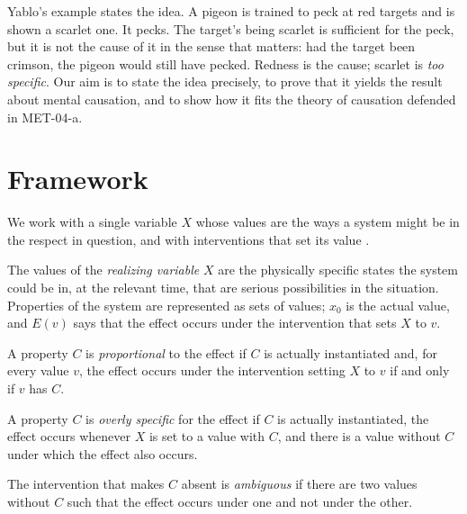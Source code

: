 \documentclass{situationist-preprint}
\begin{document}
Yablo's example states the idea. A pigeon is trained to peck at red targets and is shown a scarlet one. It pecks. The target's being scarlet is sufficient for the peck, but it is not the cause of it in the sense that matters: had the target been crimson, the pigeon would still have pecked. Redness is the cause; scarlet is \emph{too specific}. Our aim is to state the idea precisely, to prove that it yields the result about mental causation, and to show how it fits the theory of causation defended in MET-04-a.

\section{Framework}\label{s:framework}

We work with a single variable $X$ whose values are the ways a system might be in the respect in question, and with interventions that set its value \citep{Woodward2003}.

\begin{definition}\label{d:serious}
The values of the \emph{realizing variable} $X$ are the physically specific states the system could be in, at the relevant time, that are serious possibilities in the situation. Properties of the system are represented as sets of values; $x_0$ is the actual value, and $E(v)$ says that the effect occurs under the intervention that sets $X$ to $v$.
\end{definition}

\begin{definition}\label{d:prop}
A property $C$ is \emph{proportional} to the effect if $C$ is actually instantiated and, for every value $v$, the effect occurs under the intervention setting $X$ to $v$ if and only if $v$ has $C$.
\end{definition}

\begin{definition}\label{d:over}
A property $C$ is \emph{overly specific} for the effect if $C$ is actually instantiated, the effect occurs whenever $X$ is set to a value with $C$, and there is a value without $C$ under which the effect also occurs.
\end{definition}

\begin{definition}\label{d:amb}
The intervention that makes $C$ absent is \emph{ambiguous} if there are two values without $C$ such that the effect occurs under one and not under the other.
\end{definition}
\end{document}
